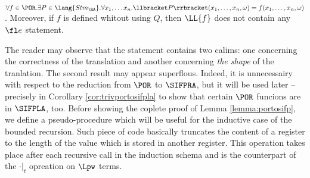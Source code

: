 \begin{lemma}
\label{lemma:portosifp}
$\forall f \in \POR.\exists P\in \lang {Stm_\RA}.\\\forall x_1, \ldots x_n.
\llbracket P\rrbracket(x_1, \ldots, x_n, \omega)=f(x_1, \ldots, x_n, \omega)$.
Moreover, if $f$ is defined whitout using $Q$,
then $\LL{f}$ does not contain any $\fl e$ statement.
\end{lemma}

The reader may observe that the statement contains two calims: one concerning the
correctness of the translation and another concerning \emph{the shape}
of the tranlation. The second result may appear superflous. Indeed,
it is unnecessairy with respect to the reduction from $\POR$ to $\SIFPRA$, but
it will be used later -- precisely in Corollary \ref{cor:trivportosifpla}
to show that certain $\POR$ funcions are in $\SIFPLA$, too.
%
Before showing the coplete proof of Lemma \ref{lemma:portosifp}, we define
a pseudo-procedure which will be useful for the inductive case of the bounded
recursion.
%
Such piece of code basically truncates the content of a register to the length
of the value which is stored in another register. This operation takes place
after each recursive call in the induction schema and is the counterpart of the
$\cdot |_{t}$ opreation on $\Lpw$ terms.


